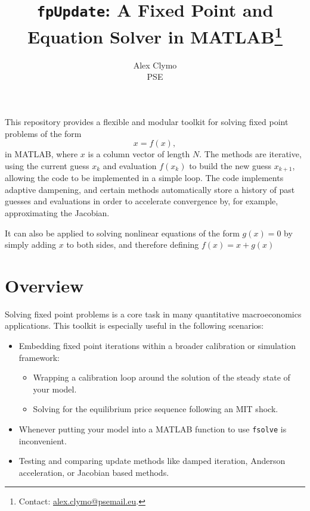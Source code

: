 \documentclass[a4paper,12pt]{article}
\newcommand{\code}[1]{\texttt{#1}}
\begin{document}
\title{\code{fpUpdate}: A Fixed Point and Equation Solver in MATLAB\thanks{\noindent \hspace*{-2em} %
Contact: \url{alex.clymo@psemail.eu}. 
}}

\author{Alex Clymo \\ PSE}

\date{}

\maketitle

This repository provides a flexible and modular toolkit for solving fixed point problems of the form
\[
x = f(x),
\]
in MATLAB, where $x$ is a column vector of length $N$. The methods are iterative, using the current guess $x_k$ and evaluation $f(x_k)$ to build the new guess $x_{k+1}$, allowing the code to be implemented in a simple loop. The code implements adaptive dampening, and certain methods automatically store a history of past guesses and evaluations in order to accelerate convergence by, for example, approximating the Jacobian. 

It can also be applied to solving nonlinear equations of the form $g(x) = 0$ by simply adding $x$ to both sides, and therefore defining $f(x) = x + g(x)$

\section{Overview}

Solving fixed point problems is a core task in many quantitative macroeconomics applications. This toolkit is especially useful in the following scenarios:
\begin{itemize}
    \item Embedding fixed point iterations within a broader calibration or simulation framework:
    \begin{itemize}
        \item Wrapping a calibration loop around the solution of the steady state of your model.
        \item Solving for the equilibrium price sequence following an MIT shock.
    \end{itemize}
    \item Whenever putting your model into a MATLAB function to use \code{fsolve} is inconvenient.
    \item Testing and comparing update methods like damped iteration, Anderson acceleration, or Jacobian based methods. 
\end{itemize}
\end{document}
